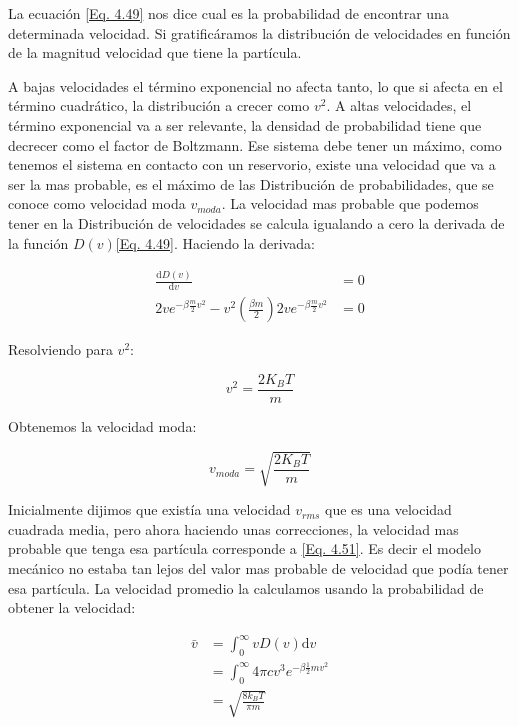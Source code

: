 \documentclass[11pt,fleqn]{book}
\begin{document}
La ecuación \ref{Eq. 4.49} nos dice cual es la probabilidad de encontrar una determinada velocidad. Si gratificáramos la distribución de velocidades en función de la magnitud velocidad que tiene la partícula.



A bajas velocidades el término exponencial no afecta tanto, lo que si afecta en el término cuadrático, la distribución a crecer como $v^{2}$. A altas velocidades, el término exponencial va a ser relevante, la densidad de probabilidad tiene que decrecer como el factor de Boltzmann. Ese sistema debe tener un máximo, como tenemos el sistema en contacto con un reservorio, existe una velocidad que va a ser la mas probable, es el máximo de las Distribución de probabilidades, que se conoce como velocidad moda $v_{moda}$. La velocidad mas probable que podemos tener en la Distribución de velocidades se calcula igualando a cero la derivada de la función $D(v)$\ref{Eq. 4.49}. Haciendo la derivada:

\begin{equation}
    \begin{split}
        \frac{\mathrm{d}D(v)}{\mathrm{d}v}&=0\\
        2ve^{-\beta\frac{m}{2}v^{2}}-v^{2}(\frac{\beta m}{2})2ve^{-\beta\frac{m}{2}v^{2}}&=0
    \end{split}
    \label{Eq. 4.50}
\end{equation}

Resolviendo para $v^{2}$:

\begin{equation*}
    v^{2}=\frac{2K_{B}T}{m}
\end{equation*}

Obtenemos la velocidad moda:

\begin{equation}
    v_{moda}=\sqrt{\frac{2K_{B}T}{m}}
    \label{Eq. 4.51}
\end{equation}

Inicialmente dijimos que existía una velocidad $v_{rms}$ que es una velocidad cuadrada media, pero ahora haciendo unas correcciones, la velocidad mas probable que tenga esa partícula corresponde a \ref{Eq. 4.51}. Es decir el modelo mecánico no estaba tan lejos del valor mas probable de velocidad que podía tener esa partícula. La velocidad promedio la calculamos usando la probabilidad de obtener la velocidad:

\begin{equation}
\begin{split}
            \bar{v}&=\int_{0}^{\infty}vD(v)\mathrm{d}v\\
            &=\int_{0}^{\infty}4\pi cv^{3}e^{-\beta\frac{1}{2}mv^{2}}\\
            &=\sqrt{\frac{8k_{B}T}{\pi m}}
\end{split}
    \label{Eq. 4.52}
\end{equation}  
\end{document}

